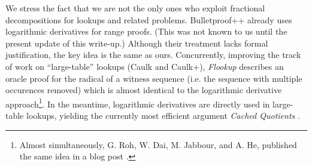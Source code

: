 \documentclass[11pt]{article}
\theoremstyle{definition}
\theoremstyle{definition}
\begin{document}
We stress the fact that we are not the only ones who exploit fractional decompositions for lookups and related problems.
Bulletproof++ \cite{BulletproofsPlusPlus} already uses logarithmic derivatives for range proofs. 
(This was not known to us until the present update of this write-up.) 
Although their treatment lacks formal justification, the key idea is the same as ours. 
Concurrently, improving the track of work \cite{Caulk, CaulkPlus} on ``large-table'' lookups (Caulk and Caulk+), \textit{Flookup} \cite{flookup} describes an oracle proof for the radical of a witness sequence (i.e. the sequence with multiple occurences removed) which is almost identical to the logarithmic derivative approach\footnote{%
Almost simultaneously, G. Roh, W. Dai, M. Jabbour, and A. He, published the same idea in a blog post \cite{DaiFlookupBlog}.
}.
In the meantime, logarithmic derivatives are directly used in large-table lookups, yielding the currently most efficient argument \textit{Cached Quotients} \cite{cq}.
\end{document}
